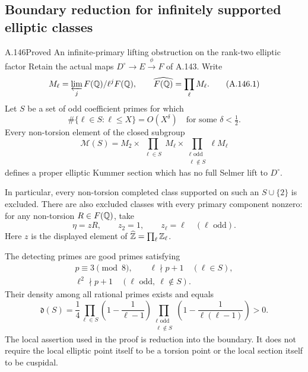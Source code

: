 \subsection{Boundary reduction for infinitely supported elliptic classes}

\begin{statement}{A.146}{Proved}
{An infinite-primary lifting obstruction on the rank-two elliptic factor}
Retain the actual maps
\(D^\circ\longrightarrow E\xrightarrow{\phi}F\) of A.143.
Write
\[
 M_\ell=\varprojlim_j F(\mathbb Q)/\ell^jF(\mathbb Q),\qquad
                 \widehat{F(\mathbb Q)}=\prod_\ell M_\ell .
\tag{A.146.1}
\]
Let \(S\) be a set of odd coefficient primes for which
\[
       \#\{\ell\in S:\ell\le X\}=O(X^\delta)
                         \quad\text{for some }\delta<\tfrac12 .
\tag{A.146.2}
\]
Every non-torsion element of the closed subgroup
\[
 \mathcal M(S)=M_2\times
      \prod_{\substack{\ell\in S}}M_\ell\times
      \prod_{\substack{\ell\text{ odd}\\\ell\notin S}}\ell M_\ell
\tag{A.146.3}
\]
defines a proper elliptic Kummer section which has no full Selmer
lift to \(D^\circ\).

In particular, every non-torsion completed class supported on
such an \(S\cup\{2\}\) is excluded.  There are also excluded
classes with every primary component nonzero: for any
non-torsion \(R\in F(\mathbb Q)\), take
\[
             \eta=zR,\qquad z_2=1,\qquad z_\ell=\ell
                               \quad(\ell\text{ odd}).
\tag{A.146.4}
\]
Here \(z\) is the displayed element of
\(\widehat{\mathbb Z}=\prod_\ell\mathbb Z_\ell\).

The detecting primes are good primes satisfying
\[
 \begin{gathered}
 p\equiv3\pmod8,\qquad
       \ell\nmid p+1\quad(\ell\in S),\\
       \ell^2\nmid p+1\quad(\ell\text{ odd},\ \ell\notin S).
 \end{gathered}
\tag{A.146.5}
\]
Their density among all rational primes exists and equals
\[
 \mathfrak d(S)=\frac14
       \prod_{\ell\in S}\left(1-\frac1{\ell-1}\right)
       \prod_{\substack{\ell\text{ odd}\\\ell\notin S}}
                   \left(1-\frac1{\ell(\ell-1)}\right)>0 .
\tag{A.146.6}
\]
The local assertion used in the proof is reduction into the
boundary.  It does not require the local elliptic point itself
to be a torsion point or the local section itself to be cuspidal.
\end{statement}

